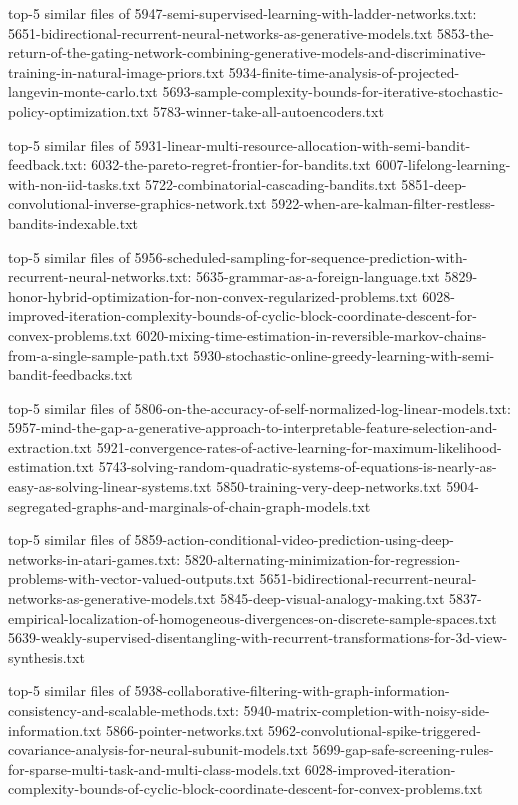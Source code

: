 \documentclass[11pt]{article}
\begin{document}
top-5 similar files of
5947-semi-supervised-learning-with-ladder-networks.txt:
5651-bidirectional-recurrent-neural-networks-as-generative-models.txt
5853-the-return-of-the-gating-network-combining-generative-models-and-discriminative-training-in-natural-image-priors.txt
5934-finite-time-analysis-of-projected-langevin-monte-carlo.txt
5693-sample-complexity-bounds-for-iterative-stochastic-policy-optimization.txt
5783-winner-take-all-autoencoders.txt

top-5 similar files of
5931-linear-multi-resource-allocation-with-semi-bandit-feedback.txt:
6032-the-pareto-regret-frontier-for-bandits.txt
6007-lifelong-learning-with-non-iid-tasks.txt
5722-combinatorial-cascading-bandits.txt
5851-deep-convolutional-inverse-graphics-network.txt
5922-when-are-kalman-filter-restless-bandits-indexable.txt

top-5 similar files of
5956-scheduled-sampling-for-sequence-prediction-with-recurrent-neural-networks.txt:
5635-grammar-as-a-foreign-language.txt
5829-honor-hybrid-optimization-for-non-convex-regularized-problems.txt
6028-improved-iteration-complexity-bounds-of-cyclic-block-coordinate-descent-for-convex-problems.txt
6020-mixing-time-estimation-in-reversible-markov-chains-from-a-single-sample-path.txt
5930-stochastic-online-greedy-learning-with-semi-bandit-feedbacks.txt

top-5 similar files of
5806-on-the-accuracy-of-self-normalized-log-linear-models.txt:
5957-mind-the-gap-a-generative-approach-to-interpretable-feature-selection-and-extraction.txt
5921-convergence-rates-of-active-learning-for-maximum-likelihood-estimation.txt
5743-solving-random-quadratic-systems-of-equations-is-nearly-as-easy-as-solving-linear-systems.txt
5850-training-very-deep-networks.txt
5904-segregated-graphs-and-marginals-of-chain-graph-models.txt

top-5 similar files of
5859-action-conditional-video-prediction-using-deep-networks-in-atari-games.txt:
5820-alternating-minimization-for-regression-problems-with-vector-valued-outputs.txt
5651-bidirectional-recurrent-neural-networks-as-generative-models.txt
5845-deep-visual-analogy-making.txt
5837-empirical-localization-of-homogeneous-divergences-on-discrete-sample-spaces.txt
5639-weakly-supervised-disentangling-with-recurrent-transformations-for-3d-view-synthesis.txt

top-5 similar files of
5938-collaborative-filtering-with-graph-information-consistency-and-scalable-methods.txt:
5940-matrix-completion-with-noisy-side-information.txt
5866-pointer-networks.txt
5962-convolutional-spike-triggered-covariance-analysis-for-neural-subunit-models.txt
5699-gap-safe-screening-rules-for-sparse-multi-task-and-multi-class-models.txt
6028-improved-iteration-complexity-bounds-of-cyclic-block-coordinate-descent-for-convex-problems.txt
\end{document}
